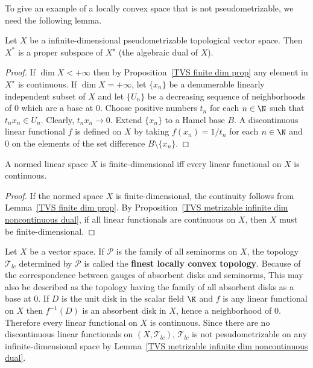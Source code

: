 To give an example of a locally convex space that is not pseudometrizable, we need the following lemma.
\begin{lemma}\label{TVS metrizable infinite dim noncontinuous dual}
Let $X$ be a infinite-dimensional pseudometrizable topological vector space. Then $X^*$ is a proper subspace of $X^\star$ (the algebraic dual of $X$).
\end{lemma}
\begin{proof}
If $\dim X<+\infty$ then by Proposition~\ref{TVS finite dim prop} any element in $X^{\star}$ is continuous. If $\dim X=+\infty$, let $\{x_n\}$ be a denumerable linearly independent subset of $X$ and let $\{U_n\}$ be a decreasing sequence of neighborhoods of $0$ which are a base at $0$. Choose positive numbers $t_n$ for each $n\in\N$ such that $t_nx_n\in U_n$. Clearly, $t_nx_n\to 0$. Extend $\{x_n\}$ to a Hamel base $B$. A discontinuous linear functional $f$ is defined on $X$ by taking $f(x_n)=1/t_n$ for each $n\in\N$ and $0$ on the elements of the set difference $B\setminus\{x_n\}$.
\end{proof}
\begin{corollary}\label{NVS finite dim iff X^star=X^*}
A normed linear space $X$ is finite-dimensional iff every linear functional on $X$ is continuous.
\end{corollary}
\begin{proof}
If the normed space $X$ is finite-dimensional, the continuity follows from Lemma~\ref{TVS finite dim prop}. By Proposition~\ref{TVS metrizable infinite dim noncontinuous dual}, if all linear functionals are continuous on $X$, then $X$ must be finite-dimensional.
\end{proof}
\begin{example}\label{LCS finest LC topo nonmetrizable}
Let $X$ be a vector space. If $\mathscr{P}$ is the family of all seminorms on $X$, the topology $\mathcal{T}_{lc}$ determined by $\mathscr{P}$ is called the \textbf{finest locally convex topology}. Because of the correspondence between gauges of absorbent disks and seminorms, This may also be described as the topology having the family of all absorbent disks as a base at $0$. If $D$ is the unit disk in the scalar field $\K$ and $f$ is any linear functional on $X$ then $f^{-1}(D)$ is an absorbent disk in $X$, hence a neighborhood of $0$. Therefore every linear functional on $X$ is continuous. Since there are no discontinuous linear functionals on $(X,\mathcal{T}_{lc})$, $\mathcal{T}_{lc}$ is not pesudometrizable on any infinite-dimensional space by Lemma~\ref{TVS metrizable infinite dim noncontinuous dual}.
\end{example}
